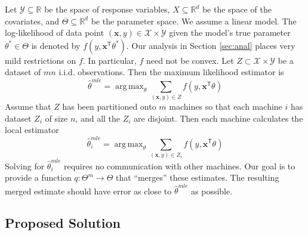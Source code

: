 \documentclass[twoside]{article}
\DeclareMathOperator*{\argmin}{arg\,min}
\DeclareMathOperator*{\argmax}{arg\,max}
\newcommand{\Q}{\mathcal{Q}}
\newcommand{\Y}{\mathcal{Y}}
\newcommand{\X}{\mathcal{X}}
\newcommand{\x}{\mathbf{x}}
\newcommand{\w}{\theta}
\newcommand{\wmle}{\hat\w^{mle}}
\newcommand{\wstar}{{\w^{*}}}
\newcommand{\wq}{\hat\w^{q}}
\newcommand{\wqstar}{\hat\w^{q^*}}
\newcommand{\trans}[1]{\ensuremath{{#1}^{\mathsf{T}}}}
\newcommand{\ltwo}[1]{{\left\lVert {#1} \right\rVert}}
\begin{document}
Let $\Y\subseteq\mathbb{R}$ be the space of response variables,
$X\subseteq\mathbb{R}^d$ be the space of the covariates,
and $\Theta\subseteq\mathbb{R}^d$ be the parameter space.
We assume a linear model.
The log-likelihood of data point $(\x,y)\in\X\times\Y$ given the model's true parameter $\wstar\in\Theta$ is denoted by $f(y,\trans\x\wstar)$.
Our analysis in Section \ref{sec:anal} places very mild restrictions on $f$.
In particular, $f$ need not be convex.
Let $Z\subset\X\times\Y$ be a dataset of $mn$ i.i.d. observations.
Then the maximum likelihood estimator is
\begin{equation}
\wmle=\argmax_\w \sum_{(\x,y)\in Z} f(y,\trans\x\w)
\end{equation}
Assume that $Z$ has been partitioned onto $m$ machines so that each machine $i$ has dataset $Z_i$ of size $n$, and all the $Z_i$ are disjoint.
Then each machine calculates the local estimator
\begin{equation}
\wmle_i = \argmax_\w \sum_{(\x,y) \in Z_i} f(y,\trans\x\w)
\end{equation}
Solving for $\wmle_i$ requires no communication with other machines.
Our goal is to provide a function $q : \Theta^m \to \Theta$ that ``merges'' these estimates.
The resulting merged estimate should have error as close to $\wmle$ as possible.


\subsection{Proposed Solution}
\end{document}
